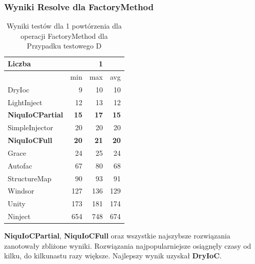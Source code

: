 \documentclass[12pt]{article}
\begin{document}
\subsubsection{Wyniki Resolve dla FactoryMethod}
\begin{table}[H]
\captionsetup{belowskip=0pt,aboveskip=0pt}
\begin{center}
\begin{small}
	\begin{tabular}{ | l | r r r | }
    		\hline
Liczba & & 1 & \\ \hline
 & min & max & avg \\ \hline
DryIoc & 9 & 10 & 10 \\ \hline
LightInject & 12 & 13 & 12 \\ \hline
\textbf{NiquIoCPartial} & \textbf{15} & \textbf{17} & \textbf{15} \\ \hline
SimpleInjector & 20 & 20 & 20 \\ \hline
\textbf{NiquIoCFull} & \textbf{20} & \textbf{21} & \textbf{20} \\ \hline
Grace & 24 & 25 & 24 \\ \hline
Autofac & 67 & 80 & 68 \\ \hline
StructureMap & 90 & 93 & 91 \\ \hline
Windsor & 127 & 136 & 129 \\ \hline
Unity & 173 & 181 & 174 \\ \hline
Ninject & 654 & 748 & 674 \\ \hline
  	\end{tabular}
\end{small}
\end{center}
\caption{Wyniki testów dla 1 powtórzenia dla operacji FactoryMethod dla Przypadku testowego D}
\label{TestCaseB_FactoryMethod1}
\end{table}
\textbf{NiquIoCPartial}, \textbf{NiquIoCFull} oraz wszystkie najszybsze rozwiązania zanotowały zbliżone wyniki. Rozwiązania najpopularniejsze osiągnęły czasy od kilku, do kilkunastu razy większe. Najlepszy wynik uzyskał \textbf{DryIoC}.
\\ \\
\end{document}
